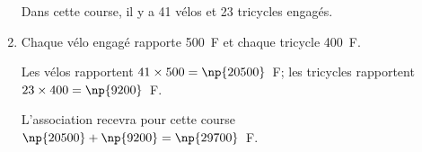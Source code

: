 \begin{enumerate}
Dans cette course, il y a 41 vélos et 23 tricycles engagés.

\item Chaque vélo engagé rapporte 500~F et chaque tricycle 400~F. %

Les vélos rapportent $41\times 500=\np{20500}$~F;
les tricycles rapportent $23\times 400=\np{9200}$~F.

L'association recevra pour cette course $\np{20500}+ \np{9200} = \np{29700}$~F.


\end{enumerate}

\vspace{0,5cm}

